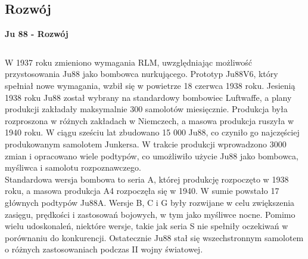 
\subsection{Rozwój}


\begin{frame}{\Huge{\textbf{Ju 88 - Rozwój}}}
	\begin{columns}[t]
			\justifying
			
W 1937 roku zmieniono wymagania RLM, uwzględniając możliwość przystosowania Ju88 jako bombowca nurkującego. Prototyp Ju88V6, który spełniał nowe wymagania, wzbił się w powietrze 18 czerwca 1938 roku. Jesienią 1938 roku Ju88 został wybrany na standardowy bombowiec Luftwaffe, a plany produkcji zakładały maksymalnie 300 samolotów miesięcznie. Produkcja była rozproszona w różnych zakładach w Niemczech, a masowa produkcja ruszyła w 1940 roku. W ciągu sześciu lat zbudowano 15 000 Ju88, co czyniło go najczęściej produkowanym samolotem Junkersa. W trakcie produkcji wprowadzono 3000 zmian i opracowano wiele podtypów, co umożliwiło użycie Ju88 jako bombowca, myśliwca i samolotu rozpoznawczego. \\
Standardowa wersja bombowa to seria A, której produkcję rozpoczęto w 1938 roku, a masowa produkcja A4 rozpoczęła się w 1940. W sumie powstało 17 głównych podtypów Ju88A. Wersje B, C i G były rozwijane w celu zwiększenia zasięgu, prędkości i zastosowań bojowych, w tym jako myśliwce nocne. Pomimo wielu udoskonaleń, niektóre wersje, takie jak seria S nie spełniły oczekiwań w porównaniu do konkurencji. Ostatecznie Ju88 stał się wszechstronnym samolotem o różnych zastosowaniach podczas II wojny światowej.
			

\end{columns}
\end{frame}
